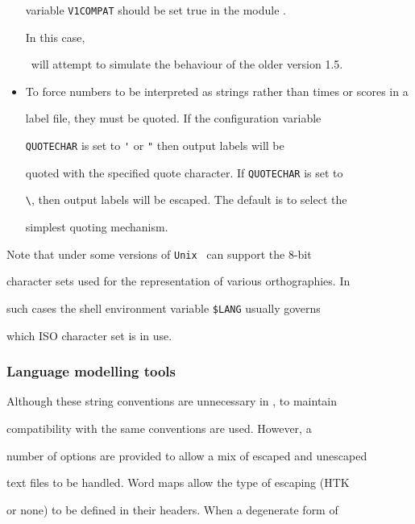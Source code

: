 \begin{itemize}
variable \texttt{V1COMPAT} should be set true in the module .  


In this case,


\HTK\ will attempt to simulate the behaviour of the older version 1.5.





\item


To force numbers to be interpreted as strings rather than times or scores in a


label file, they must be quoted.  If the configuration variable


\texttt{QUOTECHAR} is set to \verb+'+ or \verb+"+ then output labels will be


quoted with the specified quote character.  If \texttt{QUOTECHAR} is set to  


\verb+\+, then output labels will be escaped. The default is to select the 


simplest quoting mechanism.


\end{itemize}





Note that under some versions of \texttt{Unix} \HTK\ can support the 8-bit


character sets used for the representation of various orthographies. In


such cases the shell environment variable \texttt{\$LANG} usually governs


which ISO character set is in use.





\subsubsection{Language modelling tools}


Although these string conventions are unnecessary in \HLM, to maintain


compatibility with \HTK the same conventions are used. However, a


number of options are provided to allow a mix of escaped and unescaped


text files to be handled.  Word maps allow the type of escaping (HTK


or none) to be defined in their headers.  When a degenerate form of


